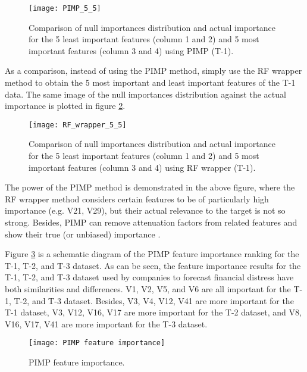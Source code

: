 \documentclass[review]{elsarticle}
\begin{document}
\begin{figure}[H]
    \centering
    \texttt{[image: PIMP\_5\_5]}
    \caption{Comparison of null importances distribution and actual importance for the 5 least important features (column 1 and 2) and 5 most important features (column 3 and 4) using PIMP (T-1).}
    \label{fig: null vs actual (PIMP)}
\end{figure}

As a comparison, instead of using the PIMP method, simply use the RF wrapper method to obtain the 5 most important and least important features of the T-1 data. The same image of the null importances distribution against the actual importance is plotted in figure \ref{fig: null vs actual (RF wrapper)}.

\begin{figure}[H]
    \centering
    \texttt{[image: RF\_wrapper\_5\_5]}
    \caption{Comparison of null importances distribution and actual importance for the 5 least important features (column 1 and 2) and 5 most important features (column 3 and 4) using RF wrapper (T-1).}
    \label{fig: null vs actual (RF wrapper)}
\end{figure}

The power of the PIMP method is demonstrated in the above figure, where the RF wrapper method considers certain features to be of particularly high importance (e.g. V21, V29), but their actual relevance to the target is not so strong. Besides, PIMP can remove attenuation factors from related features and show their true (or unbiased) importance \citep{Altmann2010}.

Figure \ref{fig: PIMP Feature Importance} is a schematic diagram of the PIMP feature importance ranking for the T-1, T-2, and T-3 dataset. As can be seen, the feature importance results for the T-1, T-2, and T-3 dataset used by companies to forecast financial distress have both similarities and differences. V1, V2, V5, and V6 are all important for the T-1, T-2, and T-3 dataset. Besides, V3, V4, V12, V41 are more important for the T-1 dataset, V3, V12, V16, V17 are more important for the T-2 dataset, and V8, V16, V17, V41 are more important for the T-3 dataset.

\begin{figure}[H]
    \centering
    \texttt{[image: PIMP feature importance]}
    \caption{PIMP feature importance.}
    \label{fig: PIMP Feature Importance}
\end{figure}
\end{document}
